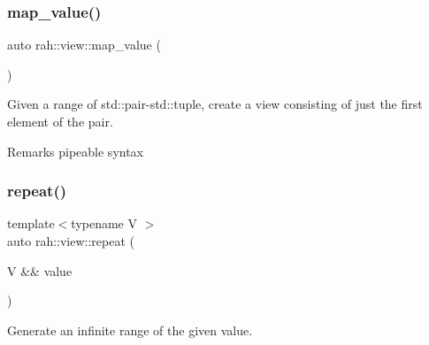 \subsubsection{\texorpdfstring{map\_value()}{map\_value()}\hspace{0.1cm}{\footnotesize\ttfamily [2/2]}}
{\footnotesize\ttfamily auto rah\+::view\+::map\+\_\+value (\begin{DoxyParamCaption}{ }\end{DoxyParamCaption})}



Given a range of std\+::pair-\/std\+::tuple, create a view consisting of just the first element of the pair. 

\begin{DoxyRemark}{Remarks}
pipeable syntax
\end{DoxyRemark}

\begin{DoxyCodeInclude}{0}
\end{DoxyCodeInclude}
\mbox{\label{namespacerah_1_1view_abd22c411fe9e0bea622ba7f829743362}} 
\subsubsection{\texorpdfstring{repeat()}{repeat()}}
{\footnotesize\ttfamily template$<$typename V $>$ \\
auto rah\+::view\+::repeat (\begin{DoxyParamCaption}\item[{V \&\&}]{value }\end{DoxyParamCaption})}



Generate an infinite range of the given value. 


